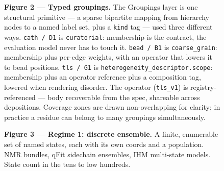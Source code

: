 \documentclass[11pt]{article}
\begin{document}
\begin{figure}[p]

\vspace{0.6em}
\footnotesize\textbf{Figure 2 — Typed groupings.}
The Groupings layer is one structural primitive — a sparse bipartite mapping
from hierarchy nodes to a named label set, plus a \texttt{kind} tag — used
three different ways. \texttt{cath / D1} is \texttt{curatorial}: membership
is the contract, the evaluation model never has to touch it. \texttt{bead /
B1} is \texttt{coarse\_grain}: membership plus per-edge weights, with an
operator that lowers it to bead positions. \texttt{tls / G1} is
\texttt{heterogeneity\_descriptor.scope}: membership plus an operator
reference plus a composition tag, lowered when rendering disorder. The
operator (\texttt{tls\_v1}) is registry-referenced — body recoverable from
the spec, shareable across depositions. Coverage zones are drawn
non-overlapping for clarity; in practice a residue can belong to many
groupings simultaneously.
\end{figure}\clearpage

\begin{figure}[p]
\centering
{}

\vspace{0.6em}
\footnotesize\textbf{Figure 3 — Regime 1: discrete ensemble.}
A finite, enumerable set of named states, each with its own coords
and a population. NMR bundles, qFit sidechain ensembles, IHM
multi-state models. State count in the tens to low hundreds.
\end{figure}\clearpage
\end{document}
